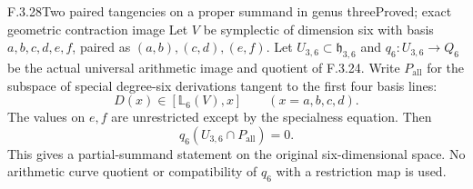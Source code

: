 \begin{result}{F.3.28}{Two paired tangencies on a proper summand in genus three}{Proved; exact geometric contraction image}
Let $V$ be symplectic of dimension six with basis
$a,b,c,d,e,f$, paired as $(a,b),(c,d),(e,f)$.
Let $U_{3,6}\subset\mathfrak h_{3,6}$ and
$q_6:U_{3,6}\to Q_6$ be the actual universal
arithmetic image and quotient of F.3.24.
Write $P_{\mathrm{all}}$ for the subspace of
special degree-six derivations tangent to the
first four basis lines:
\[
 D(x)\in[\mathbb L_6(V),x]\qquad(x=a,b,c,d).
\]
The values on $e,f$ are unrestricted except by
the specialness equation. Then
\[
                         q_6(U_{3,6}\cap P_{\mathrm{all}})=0.
                                                               \tag{PT.1}
\]
This gives a partial-summand statement on the original
six-dimensional space. No arithmetic curve quotient
or compatibility of $q_6$ with a restriction map is used.

\end{result}
